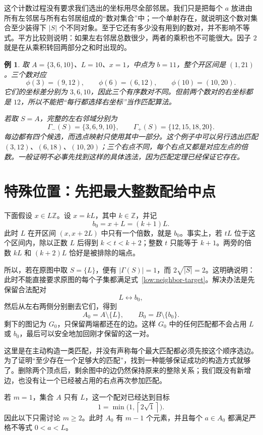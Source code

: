 \documentclass[UTF8,a4paper,oneside,openany,fontset=fandol,zihao=-4]{ctexbook}
\theoremstyle{guide}
\newtheorem{example}[theorem]{例}
\newcommand{\Z}{\mathbb Z}
\newcommand{\ceil}[1]{\left\lceil#1\right\rceil}
\begin{document}
这个计数过程没有要求我们选出的坐标用尽全部邻居。我们只是把每个 $a$ 放进由所有左邻居与所有右邻居组成的“数对集合”中；一个单射存在，就说明这个数对集合至少装得下 $|S|$ 个不同对象。至于它还有多少没有用到的数对，并不影响不等式。平方比较则说明：如果左右邻居总数很少，两者的乘积也不可能很大。因子 $2$ 就是在从乘积转回两部分之和时出现的。

\begin{example}\label{low:ordinary-example}
取 $A=\{3,6,10\}$、$L=10$、$x=1$，中点为 $b=11$，整个开区间是 $(1,21)$。三个数对应
\[
  \phi(3)=(9,12),\qquad
  \phi(6)=(6,12),\qquad
  \phi(10)=(10,20).
\]
它们的坐标差分别为 $3,6,10$，因此三个有序数对不同。但前两个数对的右坐标都是 $12$，所以不能把“每行都选择右坐标”当作匹配算法。

若取 $S=A$，完整的左右邻域分别为
\[
  \Gamma_-(S)=\{3,6,9,10\},\qquad
  \Gamma_+(S)=\{12,15,18,20\}.
\]
每边都有四个候选，而选点映射只使用其中一部分。这个例子中可以另行选出匹配 $(3,12)$、$(6,18)$、$(10,20)$；三个右点不同，每个右点又都是对应左点的倍数。一般证明不必事先找到这样的具体选法，因为匹配定理已经保证它存在。
\end{example}

\section{特殊位置：先把最大整数配给中点}

下面假设 $x\in L\Z$。设 $x=kL$，其中 $k\in\Z$，并记
\[
  b_0=x+L=(k+1)L.
\]
此时 $L$ 在开区间 $(x,x+2L)$ 中只有一个倍数，就是 $b_0$。事实上，若 $tL$ 位于这个区间内，除以正数 $L$ 后得到 $k<t<k+2$；整数 $t$ 只能等于 $k+1$。两旁的倍数 $kL$ 和 $(k+2)L$ 恰好是被排除的端点。

所以，若在原图中取 $S=\{L\}$，便有 $|\Gamma(S)|=1$，而 $2\sqrt{|S|}=2$。这明确说明：此时不能直接要求原图的每个子集都满足式~\eqref{low:neighbor-target}。解决办法是先保留合法配对
\[
  L\longleftrightarrow b_0,
\]
然后从左右两侧分别删去它们，得到
\[
  A_0=A\setminus\{L\},\qquad B_0=B\setminus\{b_0\}.
\]
剩下的图记为 $G_0$，只保留两端都还在的边。这样 $G_0$ 中的任何匹配都不会占用 $L$ 或 $b_0$，最后可以安全地加回刚才保留的这一对。

这里是在主动构造一类匹配，并没有声称每个最大匹配都必须先按这个顺序选边。为了证明“至少存在一个足够大的匹配”，找到一种能够保证成功的构造方式就够了。删除两个顶点后，剩余图中的边仍然保持原来的整除关系；我们既没有新增边，也没有让一个已经被占用的右点再次参加匹配。

若 $m=1$，集合 $A$ 只有 $L$，这一个配对已经达到目标
\[
  1=\min\bigl(1,\ceil{2\sqrt1}\bigr).
\]
因此以下只需讨论 $m\geq2$。此时 $A_0$ 有 $m-1$ 个元素，并且每个 $a\in A_0$ 都满足严格不等式 $0<a<L$。
\end{document}
